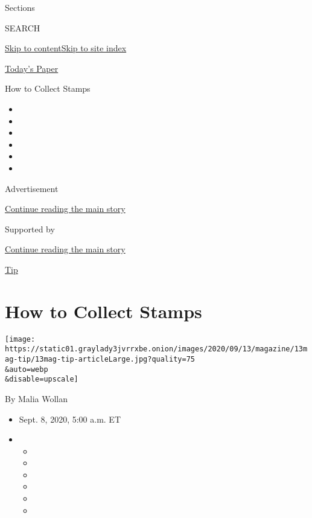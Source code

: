 Sections

SEARCH

\protect\hyperlink{site-content}{Skip to
content}\protect\hyperlink{site-index}{Skip to site index}

\href{https://myaccount.nytimes3xbfgragh.onion/auth/login?response_type=cookie\&client_id=vi}{}

\href{https://www.nytimes3xbfgragh.onion/section/todayspaper}{Today's
Paper}

How to Collect Stamps

\begin{itemize}
\item
\item
\item
\item
\item
\item
\end{itemize}

Advertisement

\protect\hyperlink{after-top}{Continue reading the main story}

Supported by

\protect\hyperlink{after-sponsor}{Continue reading the main story}

\href{/column/magazine-tip}{Tip}

\hypertarget{how-to-collect-stamps}{%
\section{How to Collect Stamps}\label{how-to-collect-stamps}}

\texttt{[image: https://static01.graylady3jvrrxbe.onion/images/2020/09/13/magazine/13mag-tip/13mag-tip-articleLarge.jpg?quality=75\\\&auto=webp\\\&disable=upscale]}

By Malia Wollan

\begin{itemize}
\item
  Sept. 8, 2020, 5:00 a.m. ET
\item
  \begin{itemize}
  \item
  \item
  \item
  \item
  \item
  \item
  \end{itemize}
\end{itemize}

